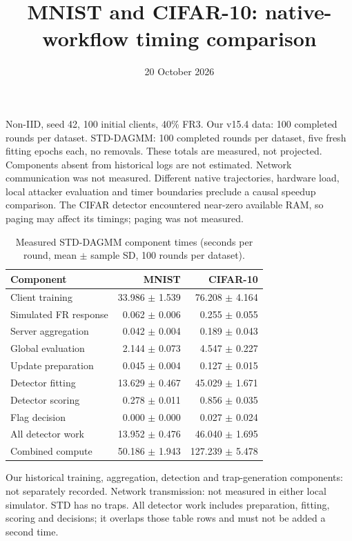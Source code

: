 \documentclass[11pt,a4paper]{article}
\title{MNIST and CIFAR-10: native-workflow timing comparison}
\author{}\date{20 October 2026}
\begin{document}
\maketitle
Non-IID, seed 42, 100 initial clients, 40\% FR3. Our v15.4 data: 100 completed rounds per dataset. STD-DAGMM: 100 completed rounds per dataset, five fresh fitting epochs each, no removals. These totals are measured, not projected. Components absent from historical logs are not estimated. Network communication was not measured. Different native trajectories, hardware load, local attacker evaluation and timer boundaries preclude a causal speedup comparison. The CIFAR detector encountered near-zero available RAM, so paging may affect its timings; paging was not measured.
\begin{table}[!ht]\centering\footnotesize
\caption{Measured STD-DAGMM component times (seconds per round, mean $\pm$ sample SD, 100 rounds per dataset).}\label{tab:std-segments}
\begin{tabular}{lrr}\toprule Component & MNIST & CIFAR-10 \\ \midrule
Client training & 33.986 $\pm$ 1.539 & 76.208 $\pm$ 4.164 \\
Simulated FR response & 0.062 $\pm$ 0.006 & 0.255 $\pm$ 0.055 \\
Server aggregation & 0.042 $\pm$ 0.004 & 0.189 $\pm$ 0.043 \\
Global evaluation & 2.144 $\pm$ 0.073 & 4.547 $\pm$ 0.227 \\
Update preparation & 0.045 $\pm$ 0.004 & 0.127 $\pm$ 0.015 \\
Detector fitting & 13.629 $\pm$ 0.467 & 45.029 $\pm$ 1.671 \\
Detector scoring & 0.278 $\pm$ 0.011 & 0.856 $\pm$ 0.035 \\
Flag decision & 0.000 $\pm$ 0.000 & 0.027 $\pm$ 0.024 \\
All detector work & 13.952 $\pm$ 0.476 & 46.040 $\pm$ 1.695 \\
Combined compute & 50.186 $\pm$ 1.943 & 127.239 $\pm$ 5.478 \\
\bottomrule\end{tabular}
\par\smallskip\begin{minipage}{0.96\textwidth}\scriptsize Our historical training, aggregation, detection and trap-generation components: not separately recorded. Network transmission: not measured in either local simulator. STD has no traps. All detector work includes preparation, fitting, scoring and decisions; it overlaps those table rows and must not be added a second time.\end{minipage}\end{table}
\end{document}
